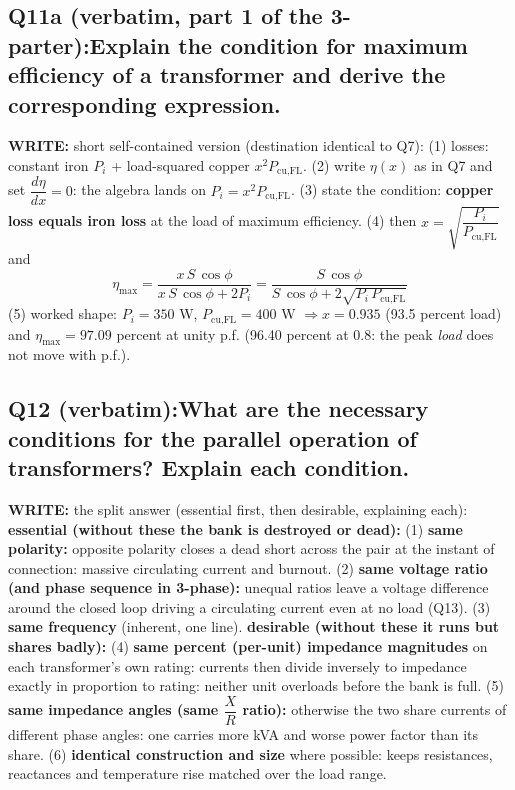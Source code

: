 \documentclass[11pt]{article}
\newcommand{\q}[2]{\subsection*{\color{copper}#1\quad\color{iron}#2}}
\newcommand{\w}[1]{\textbf{\color{copper}WRITE:} #1}
\begin{document}
\q{Q11a (verbatim, part 1 of the 3-parter):}{Explain the condition for maximum efficiency of a transformer and derive the corresponding expression.}
\w{short self-contained version (destination identical to Q7):} (1) losses: constant iron $P_i$ + load-squared copper $x^{2} P_{\text{cu,FL}}$. (2) write $\eta(x)$ as in Q7 and set $\dfrac{d\eta}{dx} = 0$: the algebra lands on $P_i = x^{2} P_{\text{cu,FL}}$. (3) state the condition: \textbf{copper loss equals iron loss} at the load of maximum efficiency. (4) then $x = \sqrt{\dfrac{P_i}{P_{\text{cu,FL}}}}$ and
\[
\eta_{\text{max}} = \dfrac{x\, S\, \cos\phi}{x\, S\, \cos\phi + 2 P_i} = \dfrac{S\, \cos\phi}{S\, \cos\phi + 2\sqrt{P_i\, P_{\text{cu,FL}}}}
\]
(5) worked shape: $P_i = 350$ W, $P_{\text{cu,FL}} = 400$ W $\Rightarrow x = 0.935$ (93.5 percent load) and $\eta_{\text{max}} = 97.09$ percent at unity p.f. (96.40 percent at 0.8: the peak \emph{load} does not move with p.f.).

\q{Q12 (verbatim):}{What are the necessary conditions for the parallel operation of transformers? Explain each condition.}
\w{the split answer (essential first, then desirable, explaining each):}
\textbf{essential (without these the bank is destroyed or dead):} (1) \textbf{same polarity:} opposite polarity closes a dead short across the pair at the instant of connection: massive circulating current and burnout. (2) \textbf{same voltage ratio (and phase sequence in 3-phase):} unequal ratios leave a voltage difference around the closed loop driving a circulating current even at no load (Q13). (3) \textbf{same frequency} (inherent, one line).
\textbf{desirable (without these it runs but shares badly):} (4) \textbf{same percent (per-unit) impedance magnitudes} on each transformer's own rating: currents then divide inversely to impedance exactly in proportion to rating: neither unit overloads before the bank is full. (5) \textbf{same impedance angles (same $\dfrac{X}{R}$ ratio):} otherwise the two share currents of different phase angles: one carries more kVA and worse power factor than its share. (6) \textbf{identical construction and size} where possible: keeps resistances, reactances and temperature rise matched over the load range.
\end{document}
